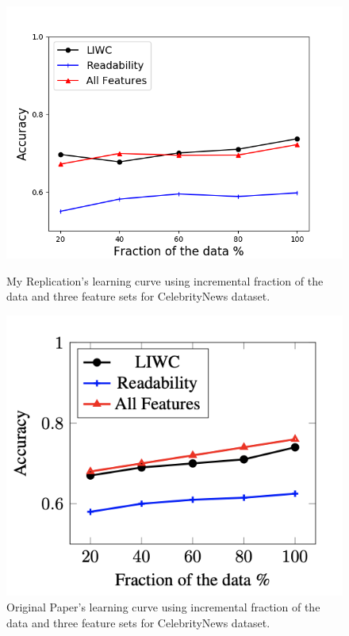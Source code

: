\documentclass{article}
\begin{document}
\begin{figure}[]
  \centering
  \begin{minipage}[b]{0.4\textwidth}
    \includegraphics[width=\textwidth]{Results_For_Paper/Figure1b-me.png}
    \caption{My Replication's learning curve using incremental fraction of the data and three feature sets for CelebrityNews dataset.}
  \end{minipage}
  \hfill
  \begin{minipage}[b]{0.4\textwidth}
    \includegraphics[width=\textwidth]{Results_For_Paper/Figure1b-real.png}
    \caption{Original Paper's learning curve using incremental fraction of the data and three feature sets for CelebrityNews dataset.}
  \end{minipage}
\end{figure}
\end{document}
